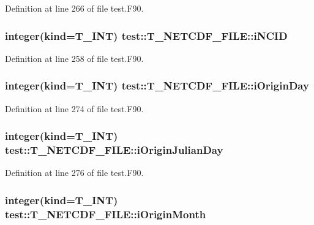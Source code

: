 Definition at line 266 of file test.F90.

\hypertarget{typetest_1_1_t___n_e_t_c_d_f___f_i_l_e_a8ef60fb746b41e53f06f6af42d0bf8b1}{
\subsubsection[{iNCID}]{\setlength{\rightskip}{0pt plus 5cm}integer(kind={\bf T\_\-INT}) {\bf test::T\_\-NETCDF\_\-FILE::iNCID}}}
\label{typetest_1_1_t___n_e_t_c_d_f___f_i_l_e_a8ef60fb746b41e53f06f6af42d0bf8b1}


Definition at line 258 of file test.F90.

\hypertarget{typetest_1_1_t___n_e_t_c_d_f___f_i_l_e_abe97e14abbdcaea7c8208298a73038ec}{
\subsubsection[{iOriginDay}]{\setlength{\rightskip}{0pt plus 5cm}integer(kind={\bf T\_\-INT}) {\bf test::T\_\-NETCDF\_\-FILE::iOriginDay}}}
\label{typetest_1_1_t___n_e_t_c_d_f___f_i_l_e_abe97e14abbdcaea7c8208298a73038ec}


Definition at line 274 of file test.F90.

\hypertarget{typetest_1_1_t___n_e_t_c_d_f___f_i_l_e_ae9ed377639dabc62d5a39c792a139ee4}{
\subsubsection[{iOriginJulianDay}]{\setlength{\rightskip}{0pt plus 5cm}integer(kind={\bf T\_\-INT}) {\bf test::T\_\-NETCDF\_\-FILE::iOriginJulianDay}}}
\label{typetest_1_1_t___n_e_t_c_d_f___f_i_l_e_ae9ed377639dabc62d5a39c792a139ee4}


Definition at line 276 of file test.F90.

\hypertarget{typetest_1_1_t___n_e_t_c_d_f___f_i_l_e_a045b2cbbd710afbc2b78101fadb2f355}{
\subsubsection[{iOriginMonth}]{\setlength{\rightskip}{0pt plus 5cm}integer(kind={\bf T\_\-INT}) {\bf test::T\_\-NETCDF\_\-FILE::iOriginMonth}}}
\label{typetest_1_1_t___n_e_t_c_d_f___f_i_l_e_a045b2cbbd710afbc2b78101fadb2f355}


